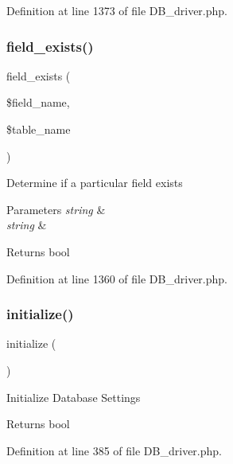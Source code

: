 Definition at line 1373 of file D\+B\+\_\+driver.\+php.

\mbox{\label{class_c_i___d_b__driver_ad349ffee1eed59a2eb8f0f1d3033764f}} 
\subsubsection{\texorpdfstring{field\_exists()}{field\_exists()}}
{\footnotesize\ttfamily field\+\_\+exists (\begin{DoxyParamCaption}\item[{}]{\$field\+\_\+name,  }\item[{}]{\$table\+\_\+name }\end{DoxyParamCaption})}

Determine if a particular field exists


\begin{DoxyParams}{Parameters}
{\em string} & \\
\hline
{\em string} & \\
\hline
\end{DoxyParams}
\begin{DoxyReturn}{Returns}
bool 
\end{DoxyReturn}


Definition at line 1360 of file D\+B\+\_\+driver.\+php.

\mbox{\label{class_c_i___d_b__driver_a91098fa7d1917ce4833f284bbef12627}} 
\subsubsection{\texorpdfstring{initialize()}{initialize()}}
{\footnotesize\ttfamily initialize (\begin{DoxyParamCaption}{ }\end{DoxyParamCaption})}

Initialize Database Settings

\begin{DoxyReturn}{Returns}
bool 
\end{DoxyReturn}


Definition at line 385 of file D\+B\+\_\+driver.\+php.

